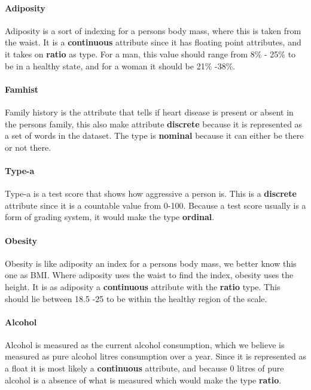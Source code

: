 \paragraph{Adiposity} Adiposity is a sort of indexing for a persons body mass, where this is taken from the waist. It is a \textbf{continuous} attribute since it has floating point attributes, and it takes on \textbf{ratio} as type. For a man, this value should range from 8\% - 25\% to be in a healthy state, and for a woman it should be 21\% -38\%.

\paragraph{Famhist} Family history is the attribute that tells if heart disease is present or absent in the persons family, this also make attribute \textbf{discrete} because it is represented as a set of words in the dataset. The type is \textbf{nominal} because it can either be there or not there.

\paragraph{Type-a} Type-a is a test score that shows how aggressive a person is. This is a \textbf{discrete} attribute since it is a countable value from 0-100. Because a test score usually is a form of grading system, it would make the type \textbf{ordinal}.

\paragraph{Obesity} Obesity is like adiposity an index for a persons body mass, we better know this one as BMI. Where adiposity uses the waist to find the index, obesity uses the height. It is as adiposity a \textbf{continuous} attribute with the \textbf{ratio} type. This should lie between 18.5 -25 to be within the healthy region of the scale.

\paragraph{Alcohol} Alcohol is measured as the current alcohol consumption, which we believe is measured as pure alcohol litres consumption over a year. Since it is represented as a float it is most likely a \textbf{continuous} attribute, and because 0 litres of pure alcohol is a absence of what is measured which would make the type \textbf{ratio}.

